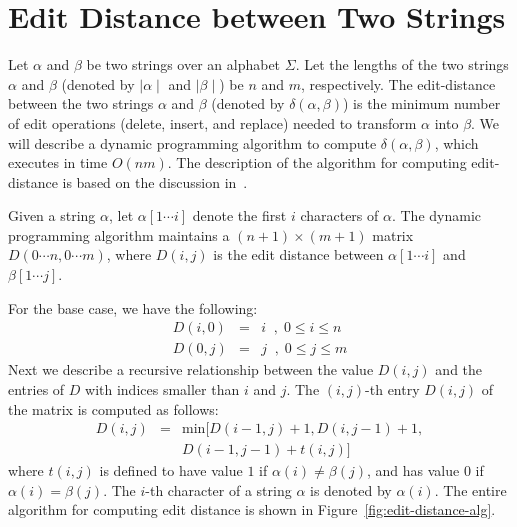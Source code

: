 \section{Edit Distance between Two Strings}
\label{sec:edit-distance}


Let $\alpha$ and $\beta$ be two strings over an alphabet $\Sigma$.
Let the lengths of the two strings $\alpha$ and $\beta$ (denoted by $ \mid
\alpha \mid $ and $ \mid \beta \mid $) be $n$ and $m$, respectively. The
edit-distance between the two strings $\alpha$ and $\beta$ (denoted by
$\delta (\alpha,\beta)$) is the minimum number of edit operations
({\sf delete}, {\sf insert}, and {\sf replace}) needed to transform
$\alpha$ into $\beta$. We will describe a dynamic programming
algorithm to compute $\delta (\alpha,\beta)$, which executes in time
$O(nm)$. The description of the algorithm for computing edit-distance
is based on the discussion in~\cite{Gusfield}.

Given a
string $\alpha$, let $\alpha [1 \cdots i]$ denote the first $i$
characters of $\alpha$.  The dynamic programming algorithm maintains a
$(n+1) \times (m+1)$ matrix $D(0 \cdots n, 0 \cdots m)$, where
$D(i,j)$ is the edit distance between $\alpha [1 \cdots i]$ and $\beta
[1 \cdots j]$.


For the
base case, we have the following:
\begin{eqnarray}
\label{eqn:base-case}
D(i,0) & = & i \;\; , \; 0 \leq i \leq n \\
D(0,j) & = & j \;\; , \; 0 \leq j \leq m
\end{eqnarray}
Next we describe a recursive relationship between the value $D(i,j)$ 
and the entries of $D$ with indices smaller than $i$ and $j$.
The $(i,j)$-th entry $D(i,j)$ of the matrix is computed as follows:
\begin{eqnarray}
\label{eqn:recursive}
D(i,j) & = & \mbox{min} [ D(i-1,j) + 1, D(i,j-1)+1, \nonumber \\
       &  & D(i-1,j-1)+t(i,j) ]
\end{eqnarray}
where $t(i,j)$ is defined to have value $1$ if $\alpha (i) \not= \beta (j)$, and
has value $0$ if $\alpha (i) = \beta (j)$. The $i$-th character of a string $\alpha$
is denoted by $\alpha (i)$. The entire algorithm for computing edit distance is shown
in Figure~\ref{fig:edit-distance-alg}.

